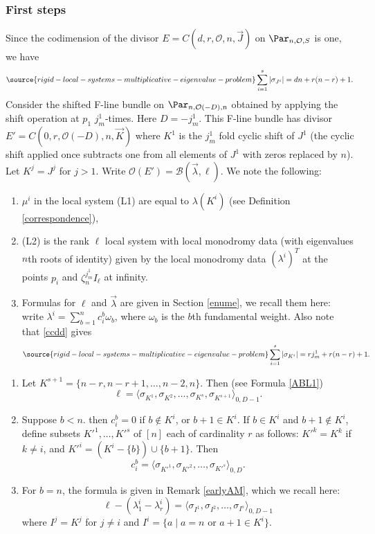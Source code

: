 \subsubsection{First steps}\label{atonal}
 Since the codimension of the divisor
$E=C(d,r,\mathcal{O},n,\vec{J})$ on $\Par_{n,{\mathcal{O}},S}$ is one, we have
 \begin{equation}\label{ccdd}
\source{rigid-local-systems-multiplicative-eigenvalue-problem}
\sum_{i=1}^s |\sigma_{J^i}|=dn +r(n-r)+1.
\end{equation}
Consider the shifted F-line bundle on $\Par_{n,\mathcal{O}(-D),n}$ obtained by applying the shift operation at $p_1$ $j^1_m$-times. Here $D=-j^1_m$. This F-line bundle has divisor  $E'=C(0,r,\mathcal{O}(-D),n,\vec{K})$ where  $K^1$ is the $j^1_m$ fold cyclic shift of $J^1$ (the cyclic shift applied once subtracts one from all elements of ${J}^1$ with zeros replaced by $n$). Let $K^j=J^j$ for $j>1$. Write $\mathcal{O}(E')= \mathcal{B}(\vec{\lambda},\ell)$.
We note the following:
\begin{enumerate}
\item [(I)]  $\mu^i$ in the local system (L1) are equal to $\lambda(K^i)$ (see Definition  \ref{correspondence}),
\item[(II)](L2) is the rank $\ell$ local system with local monodromy data (with eigenvalues $n$th roots of identity) given by the local monodromy  data $(\lambda^i)^T$ at the points $p_i$ and
$\zeta_n^{j^1_{m}}I_{\ell}$ at infinity.
\item[(III)] Formulas for  $\ell$ and $\vec{\lambda}$ are given in Section \ref{enume}, we recall them here: write
$\lambda^i=\sum_{b=1}^{n} c_{i}^{b}\omega_b$, where $\omega_b$ is the $b$th fundamental weight.
Also note that \eqref{ccdd} gives
\begin{equation}\label{cccddd}
\source{rigid-local-systems-multiplicative-eigenvalue-problem}
\sum_{i=1}^s |\sigma_{K^i}|=rj^1_m +r(n-r)+1.
\end{equation}
 \end{enumerate}

\begin{enumerate}
\item[(A)] Let $K^{s+1}=\{n-r,n-r+1,\dots,n-2,n\}$. Then (see Formula \ref{ABL1})
$$\ell=\langle\sigma_{K^1}, \sigma_{K^2},\dots,\sigma_{K^s},\sigma_{K^{s+1}}\rangle_{0,D-1}.$$

\item[(B)] Suppose $b<n$. then $c_{i}^{b}=0$ if $b\not\in K^i$, or $b+1\in K^i$. If $b\in K^i$ and $b+1\not\in K^i$, define subsets $K'^1,\dots,K'^s$ of $[n]$
 each of cardinality $r$ as follows: $K'^k=K^k$ if $k\neq i$, and $K'^i=(K^i-\{b\})\cup \{b+1\}$. Then
$$c_i^{b}= \langle\sigma_{K'^1}, \sigma_{K'^2},\dots,\sigma_{K'^s}\rangle_{0,D}.$$
\item[(C)] For $b=n$, the formula is given in Remark \ref{earlyAM}, which we recall here:
$$\ell-(\lambda^i_{1}-\lambda^i_{r})=\langle\sigma_{I^1}, \sigma_{I^2},\dots,\sigma_{I^s}\rangle_{0,D-1}$$
where $I^j=K^j$ for $j\neq i$ and $I^i= \{a\mid a=n\text{ or } a+1\in K^i\}$.
\end{enumerate}
